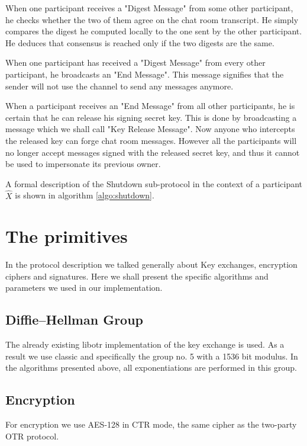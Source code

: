 When one participant receives a "Digest Message" from some other participant, he checks whether the two of them agree on the chat room transcript. He simply compares the digest he computed locally to the one sent by the other participant. He deduces that consensus is reached only if the two digests are the same.

When one participant has received a "Digest Message" from every other participant, he broadcasts an "End Message". This message signifies that the sender will not use the channel to send any messages anymore.

When a participant receives an "End Message" from all other participants, he is certain that he can release his signing secret key. This is done by broadcasting a message which we shall call "Key Release Message". Now anyone who intercepts the released key can forge chat room messages. However all the participants will no longer accept messages signed with the released secret key, and thus it cannot be used to impersonate its previous owner.

A formal description of the Shutdown sub-protocol in the context of a participant $\hat{X}$ is shown in algorithm \ref{algo:shutdown}.

\section{The primitives}
\label{setions:Protocol:primitives}
In the protocol description we talked generally about \dhname Key exchanges, encryption ciphers and signatures.
Here we shall present the specific algorithms and parameters we used in our implementation.

\subsection{Diffie--Hellman Group}
The already existing libotr implementation of the \dhname key exchange is used.
As a result we use classic \dhname and specifically the group no. 5 \cite{website:dh-rfc} with a 1536 bit modulus.
In the algorithms presented above, all exponentiations are performed in this group.

\subsection{Encryption}

For encryption we use AES-128 in CTR mode, the same cipher as the two-party OTR protocol.

